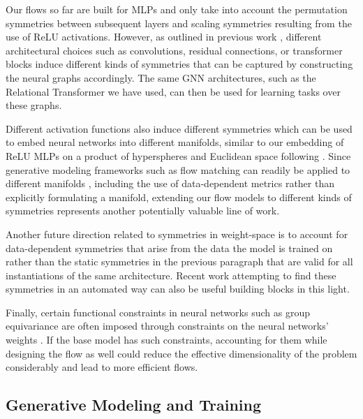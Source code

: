 Our flows so far are built for MLPs and only take into account the permutation symmetries between subsequent layers and scaling symmetries resulting from the use of ReLU activations. However, as outlined in previous work \citep{kofinasGraphNeuralNetworks2024,limGraphMetanetworksProcessing2023}, different architectural choices such as convolutions, residual connections, or transformer blocks induce different kinds of symmetries that can be captured by constructing the neural graphs accordingly. The same GNN architectures, such as the Relational Transformer we have used, can then be used for learning tasks over these graphs. 

Different activation functions also induce different symmetries \citep{godfreySymmetriesDeepLearning2022} which can be used to embed neural networks into different manifolds, similar to our embedding of ReLU MLPs on a product of hyperspheres and Euclidean space following \citep{pittorinoDeepNetworksToroids2022}. Since generative modeling frameworks such as flow matching can readily be applied to different manifolds \citep{chenRiemannianFlowMatching2023}, including the use of data-dependent metrics \citep{kapusniakMetricFlowMatching2024} rather than explicitly formulating a manifold, extending our flow models to different kinds of symmetries represents another potentially valuable line of work. 

Another future direction related to symmetries in weight-space is to account for data-dependent symmetries \citep{zhaoSymmetriesFlatMinima2023} that arise from the data the model is trained on rather than the static symmetries in the previous paragraph that are valid for all instantiations of the same architecture. Recent work attempting to find these symmetries in an automated way \citep{zhaoFindingSymmetryNeural2024} can also be useful building blocks in this light. 

Finally, certain functional constraints in neural networks such as group equivariance are often imposed through constraints on the neural networks' weights \citep{weilerEquivariantCoordinateIndependent2023}. If the base model has such constraints, accounting for them while designing the flow as well could reduce the effective dimensionality of the problem considerably and lead to more efficient flows. 

\subsection{Generative Modeling and Training}

